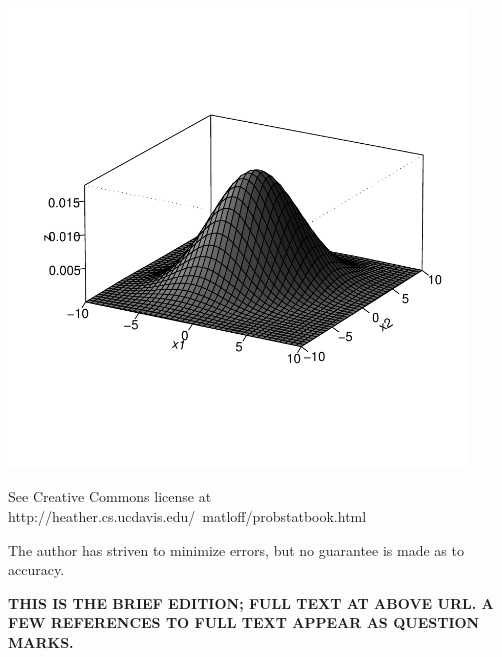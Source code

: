 \vspace{-1.75in}
\begin{center}
\includegraphics[width=4.8in]{Bell.pdf}

{See Creative Commons license at \\ 
\vspace{0.2in}
{http://heather.cs.ucdavis.edu/~matloff/probstatbook.html}
}

The author has striven to minimize errors, but no guarantee is made as to
accuracy.  

\end{center}

{\bf THIS IS THE BRIEF EDITION; FULL TEXT AT ABOVE URL.  
A FEW REFERENCES TO FULL TEXT APPEAR AS QUESTION MARKS.}

